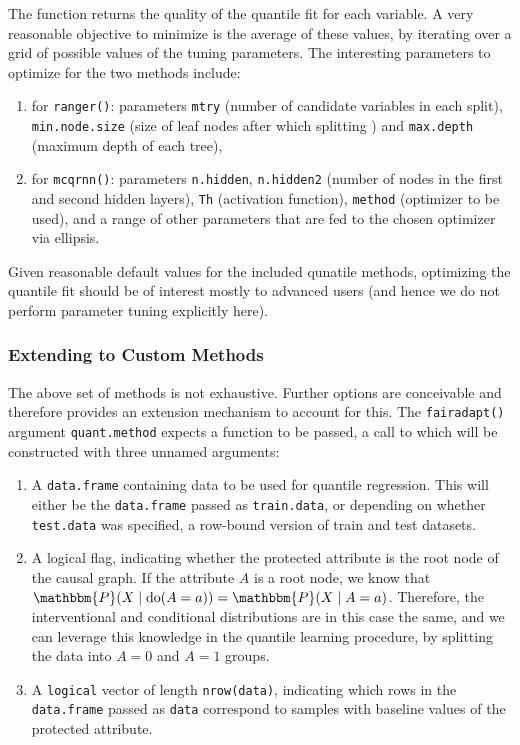 \documentclass[
  nojss]{jss}
\providecommand{\tightlist}{%
  \setlength{\itemsep}{0pt}\setlength{\parskip}{0pt}}
\begin{document}
The function returns the quality of the quantile fit for each variable.
A very reasonable objective to minimize is the average of these values,
by iterating over a grid of possible values of the tuning parameters.
The interesting parameters to optimize for the two methods include:

\begin{enumerate}
\def\labelenumi{(\roman{enumi})}
\tightlist
\item
  for \texttt{ranger()}: parameters \texttt{mtry} (number of candidate
  variables in each split), \texttt{min.node.size} (size of leaf nodes
  after which splitting ) and \texttt{max.depth} (maximum depth of each
  tree),
\item
  for \texttt{mcqrnn()}: parameters \texttt{n.hidden},
  \texttt{n.hidden2} (number of nodes in the first and second hidden
  layers), \texttt{Th} (activation function), \texttt{method} (optimizer
  to be used), and a range of other parameters that are fed to the
  chosen optimizer via ellipsis.
\end{enumerate}

Given reasonable default values for the included qunatile methods,
optimizing the quantile fit should be of interest mostly to advanced
users (and hence we do not perform parameter tuning explicitly here).

\hypertarget{extending-to-custom-methods}{%
\subsubsection{Extending to Custom
Methods}\label{extending-to-custom-methods}}

The above set of methods is not exhaustive. Further options are
conceivable and therefore  provides an extension
mechanism to account for this. The \texttt{fairadapt()} argument
\texttt{quant.method} expects a function to be passed, a call to which
will be constructed with three unnamed arguments:

\begin{enumerate}
\def\labelenumi{\arabic{enumi}.}
\tightlist
\item
  A \texttt{data.frame} containing data to be used for quantile
  regression. This will either be the \texttt{data.frame} passed as
  \texttt{train.data}, or depending on whether \texttt{test.data} was
  specified, a row-bound version of train and test datasets.
\item
  A logical flag, indicating whether the protected attribute is the root
  node of the causal graph. If the attribute \(A\) is a root node, we
  know that
  \(\mathbbm{P}(X \mid \text{do}(A = a)) = \mathbbm{P}(X \mid A = a)\).
  Therefore, the interventional and conditional distributions are in
  this case the same, and we can leverage this knowledge in the quantile
  learning procedure, by splitting the data into \(A = 0\) and \(A = 1\)
  groups.
\item
  A \texttt{logical} vector of length \texttt{nrow(data)}, indicating
  which rows in the \texttt{data.frame} passed as \texttt{data}
  correspond to samples with baseline values of the protected attribute.
\end{enumerate}
\end{document}
